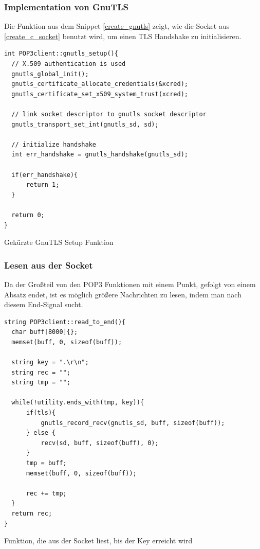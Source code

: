 \documentclass[12pt, letterpaper]{article}
\newenvironment{code}{\captionsetup{type=listing}}{}
\begin{document}
\subsubsection{Implementation von GnuTLS}
\label{gnutls_implement_proj}
Die Funktion aus dem Snippet \ref{create_gnutls} zeigt, wie die Socket aus \ref{create_c_socket} benutzt wird, um einen TLS Handshake zu initialisieren.

\begin{code}
\begin{verbatim}
int POP3client::gnutls_setup(){
  // X.509 authentication is used
  gnutls_global_init();
  gnutls_certificate_allocate_credentials(&xcred);
  gnutls_certificate_set_x509_system_trust(xcred);

  // link socket descriptor to gnutls socket descriptor
  gnutls_transport_set_int(gnutls_sd, sd);

  // initialize handshake
  int err_handshake = gnutls_handshake(gnutls_sd);

  if(err_handshake){
      return 1;
  }

  return 0;
}
\end{verbatim}
\caption{Gekürzte GnuTLS Setup Funktion}
\label{create_gnutls}
\end{code}

\subsubsection{Lesen aus der Socket}

Da der Großteil von den POP3 Funktionen mit einem Punkt, gefolgt von einem Absatz endet, ist es möglich größere Nachrichten zu lesen, indem man nach diesem End-Signal sucht.

\begin{code}
\begin{verbatim}
string POP3client::read_to_end(){
  char buff[8000]{};
  memset(buff, 0, sizeof(buff));

  string key = ".\r\n";
  string rec = "";
  string tmp = "";

  while(!utility.ends_with(tmp, key)){
      if(tls){
          gnutls_record_recv(gnutls_sd, buff, sizeof(buff));
      } else {
          recv(sd, buff, sizeof(buff), 0);
      }
      tmp = buff;
      memset(buff, 0, sizeof(buff));

      rec += tmp;
  }
  return rec;
}
\end{verbatim}
\caption{Funktion, die aus der Socket liest, bis der Key erreicht wird}
\label{read_to_end}
\end{code}
\end{document}
